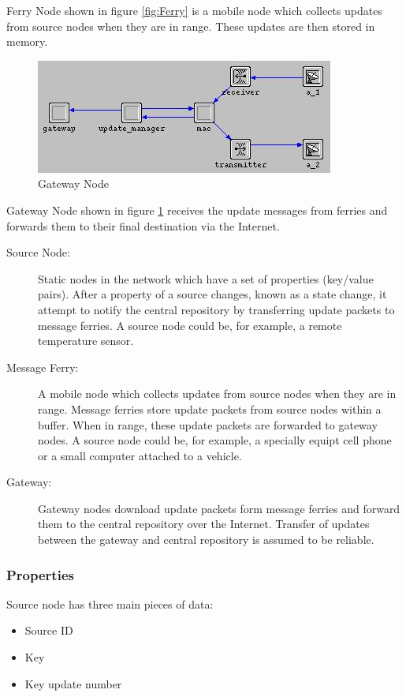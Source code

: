 Ferry Node shown in figure \ref{fig:Ferry} is a mobile node which collects updates from source nodes when they are in range. These updates are then stored in memory.

\begin{figure}[h]
    \centering
    \includegraphics[width=.5\textwidth]{images/gateway}
    \caption{Gateway Node}
    \label{fig:Gateway}
\end{figure}

Gateway Node shown in figure \ref{fig:Gateway} receives the update messages from ferries and forwards them to their final destination via the Internet. 
\begin{description}

\item[Source Node: ] 
Static nodes in the network which have a set of properties (key/value pairs).
After a property of a source changes, known as a state change, it attempt to notify the central repository by transferring update packets to message ferries.
A source node could be, for example, a remote temperature sensor.
\item[Message Ferry: ] 
A mobile node which collects updates from source nodes when they are in range.
Message ferries store update packets from source nodes within a buffer. 
When in range, these update packets are forwarded to gateway nodes.
A source node could be, for example, a specially equipt cell phone or a small computer attached to a vehicle. 
\item[Gateway: ]
Gateway nodes download update packets form message ferries and forward them to the central repository over the Internet.
Transfer of updates between the gateway and central repository is assumed to be reliable. 

\end{description}


\subsubsection{Properties}

Source node has three main pieces of data:
\begin{itemize}
\item Source ID
\item Key
\item Key update number
\end{itemize}

